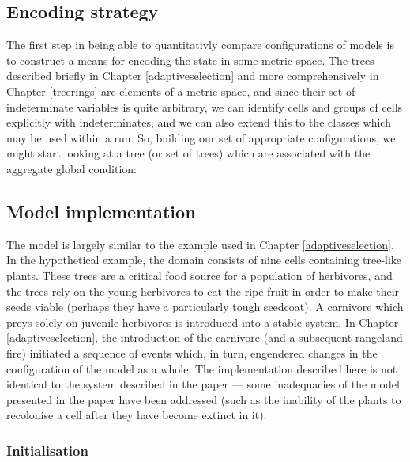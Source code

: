 \subsection{Encoding strategy}
The first step in being able to quantitativly compare configurations
of models is to construct a means for encoding the state in some
metric space.  The trees described briefly in Chapter
\ref{adaptiveselection} and more comprehensively in Chapter
\ref{treerings} are elements of a metric space, and since their set of
indeterminate variables is quite arbitrary, we can identify cells and
groups of cells explicitly with indeterminates, and we can also extend
this to the classes which may be used within a run.  So, building our
set of appropriate configurations, we might start looking at a tree
(or set of trees) which are associated with the aggregate global
condition:
















\subsection{Model implementation}

The model is largely similar to the example used in Chapter
\ref{adaptiveselection}. In the hypothetical example, the domain
consists of nine cells containing tree-like plants. These trees are a
critical food source for a population of herbivores, and the trees
rely on the young herbivores to eat the ripe fruit in order to make
their seeds viable (perhaps they have a particularly tough
seedcoat). A carnivore which preys solely on juvenile herbivores is
introduced into a stable system.  In Chapter \ref{adaptiveselection},
the introduction of the carnivore (and a subsequent rangeland fire)
initiated a sequence of events which, in turn, engendered
changes in the configuration of the model as a whole.  The
implementation described here is not identical to the system described
in the paper --- some inadequacies of the model presented in the paper
have been addressed (such as the inability of the plants to recolonise
a cell after they have become extinct in it).

\subsubsection{Initialisation}

